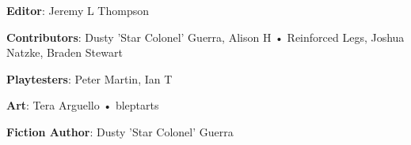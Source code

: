 \begin{description}

\item {\bfseries Editor}: Jeremy L Thompson

\item {\bfseries Contributors}: Dusty 'Star Colonel' Guerra, Alison H • Reinforced Legs, Joshua Natzke, Braden Stewart

\item {\bfseries Playtesters}: Peter Martin, Ian T

\item {\bfseries Art}: Tera Arguello • bleptarts

\item {\bfseries Fiction Author}: Dusty 'Star Colonel' Guerra

\end{description}
